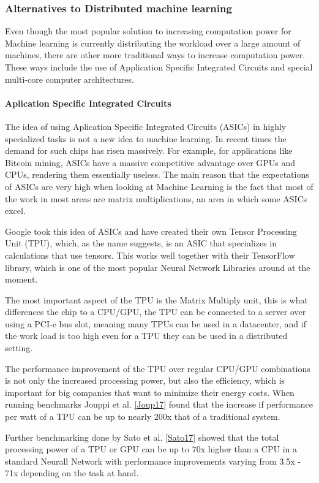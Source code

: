 
\subsubsection{Alternatives to Distributed machine learning}
Even though the most popular solution to increasing computation power for Machine
learning is currently distributing the workload over a large amount of machines,
there are other more traditional ways to increase computation power. These ways
include the use of Application Specific Integrated Circuits and special multi-core
computer architectures.

\paragraph{Aplication Specific Integrated Circuits}
The idea of using Aplication Specific Integrated Circuits (ASICs) in highly specialized tasks is not a new idea to machine learning. In recent times the demand for such chips has risen massively\cite{Metz18}.
For example, for applications like Bitcoin mining, ASICs have a massive competitive advantage over GPUs and CPUs, rendering them essentially useless. The main reason that the expectations of ASICs are very high when looking at Machine
Learning is the fact that most of the work in most areas are matrix multiplications, an area in which some ASICs excel.

Google took this idea of ASICs and have created their own Tensor Processing Unit (TPU)\cite{Sato17}, which, as the name suggests, is an ASIC that specializes in calculations that use tensors. This works well together with their TensorFlow library, which is one of the most popular Neural Network Libraries around at the moment.


The most important aspect of the TPU is the Matrix Multiply unit, this is what differences the chip to a CPU/GPU, the TPU can be connected to a server over using a PCI-e bus slot, meaning many TPUs can be used in a datacenter, and if the work load is too high even for a TPU they can be used in a distributed setting.

The performance improvement of the TPU over regular CPU/GPU combinations is not only the increased processing power, but also the efficiency, which is important
for big companies that want to minimize their energy costs. When running benchmarks Jouppi et al. \ref{Joup17} found that the increase if performance per watt of a TPU can be up to nearly 200x that of a traditional system.

Further benchmarking done by Sato et al. \ref{Sato17} showed that the total processing power of a TPU or GPU can be up to 70x higher than a CPU in a standard Neurall Network with performance improvements varying from 3.5x - 71x depending on the task at hand.


